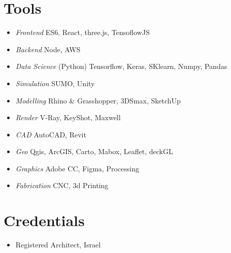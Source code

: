 \section*{Tools}
    
\begin{itemize}
    \item \textit{Frontend} \tab ES6, React, three.js, TensoflowJS
    \item \textit{Backend} \tab Node, AWS 
    \item \textit{Data Science} \tab (Python) Tensorflow, Keras, SKlearn, Numpy, Pandas 
    \item \textit{Simulation} \tab SUMO, Unity
    \item \textit{Modelling} \tab Rhino \& Grasshopper, 3DSmax, SketchUp 
    \item \textit{Render} \tab V-Ray, KeyShot, Maxwell
    \item \textit{CAD} \tab AutoCAD, Revit
    \item \textit{Geo} \tab Qgis, ArcGIS, Carto, Mabox, Leaflet, deckGL 
    \item \textit{Graphics} \tab Adobe CC, Figma, Processing
    \item \textit{Fabrication} \tab CNC, 3d Printing 
\end{itemize}

\section*{Credentials}

    \begin{itemize}
        \item Registered Architect, Israel 
    \end{itemize}



  















